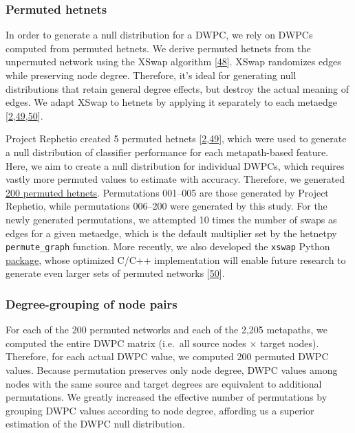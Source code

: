 \hypertarget{permuted-hetnets}{%
\subsubsection{Permuted hetnets}\label{permuted-hetnets}}

In order to generate a null distribution for a DWPC, we rely on DWPCs computed from permuted hetnets.
We derive permuted hetnets from the unpermuted network using the XSwap algorithm {[}\protect\hyperlink{ref-iKOIEzQ9}{48}{]}.
XSwap randomizes edges while preserving node degree.
Therefore, it's ideal for generating null distributions that retain general degree effects,
but destroy the actual meaning of edges.
We adapt XSwap to hetnets by applying it separately to each metaedge {[}\protect\hyperlink{ref-O21tn8vf}{2},\protect\hyperlink{ref-GE6jhWnt}{49},\protect\hyperlink{ref-83EvMSI6}{50}{]}.

Project Rephetio created 5 permuted hetnets {[}\protect\hyperlink{ref-O21tn8vf}{2},\protect\hyperlink{ref-GE6jhWnt}{49}{]},
which were used to generate a null distribution of classifier performance for each metapath-based feature.
Here, we aim to create a null distribution for individual DWPCs, which requires vastly more permuted values to estimate with accuracy.
Therefore, we generated \href{https://github.com/hetio/hetionet/tree/a95ae76581af604e91d744680aee3f888fa18887/hetnet/permuted/matrix}{200 permuted hetnets}.
Permutations 001--005 are those generated by Project Rephetio,
while permutations 006--200 were generated by this study.
For the newly generated permutations, we attempted 10 times the number of swaps as edges for a given metaedge,
which is the default multiplier set by the hetnetpy \texttt{permute\_graph} function.
More recently, we also developed the \texttt{xswap} Python \href{https://github.com/greenelab/xswap}{package}, whose optimized C/C++ implementation will enable future research to generate even larger sets of permuted networks {[}\protect\hyperlink{ref-83EvMSI6}{50}{]}.

\hypertarget{degree-grouping-of-node-pairs}{%
\subsubsection{Degree-grouping of node pairs}\label{degree-grouping-of-node-pairs}}

For each of the 200 permuted networks and each of the 2,205 metapaths, we computed the entire DWPC matrix (i.e.~all source nodes × target nodes).
Therefore, for each actual DWPC value, we computed 200 permuted DWPC values.
Because permutation preserves only node degree, DWPC values among nodes with the same source and target degrees are equivalent to additional permutations.
We greatly increased the effective number of permutations by grouping DWPC values according to node degree, affording us a superior estimation of the DWPC null distribution.

